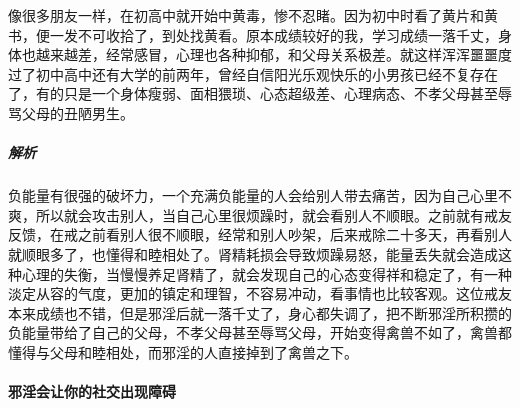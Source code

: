 \begin{case}
    像很多朋友一样，在初高中就开始中黄毒，惨不忍睹。因为初中时看了黄片和黄书，便一发不可收拾了，到处找黄看。原本成绩较好的我，学习成绩一落千丈，身体也越来越差，经常感冒，心理也各种抑郁，和父母关系极差。就这样浑浑噩噩度过了初中高中还有大学的前两年，曾经自信阳光乐观快乐的小男孩已经不复存在了，有的只是一个身体瘦弱、面相猥琐、心态超级差、心理病态、不孝父母甚至辱骂父母的丑陋男生。
    \subparagraph{解析} 负能量有很强的破坏力，一个充满负能量的人会给别人带去痛苦，因为自己心里不爽，所以就会攻击别人，当自己心里很烦躁时，就会看别人不顺眼。之前就有戒友反馈，在戒之前看别人很不顺眼，经常和别人吵架，后来戒除二十多天，再看别人就顺眼多了，也懂得和睦相处了。肾精耗损会导致烦躁易怒，能量丢失就会造成这种心理的失衡，当慢慢养足肾精了，就会发现自己的心态变得祥和稳定了，有一种淡定从容的气度，更加的镇定和理智，不容易冲动，看事情也比较客观。这位戒友本来成绩也不错，但是邪淫后就一落千丈了，身心都失调了，把不断邪淫所积攒的负能量带给了自己的父母，不孝父母甚至辱骂父母，开始变得禽兽不如了，禽兽都懂得与父母和睦相处，而邪淫的人直接掉到了禽兽之下。
\end{case}

\paragraph{邪淫会让你的社交出现障碍}

